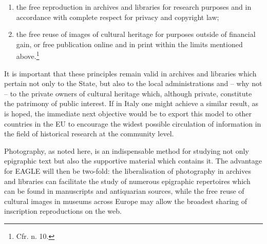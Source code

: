 \documentclass[amsthm,ebook]{saparticle}
\begin{document}
\begin{enumerate}
\item the free reproduction in archives and libraries for research purposes and in accordance with complete respect for
privacy and copyright law;

\item the free reuse of images of cultural heritage for purposes outside of financial gain, or free publication online
and in print within the limits mentioned above.\footnote{Cfr. n. 10.}

\end{enumerate}

It is important that these principles remain valid in archives and libraries which pertain not only to the State, but
also to the local administrations and – why not – to the private owners of cultural heritage which, although private,
constitute the patrimony of public interest. If in Italy one might achieve a similar result, as is hoped, the immediate
next objective would be to export this model to other countries in the EU to encourage the widest possible circulation
of information in the field of historical research at the community level.

Photography, as noted here, is an indispensable method for studying not only epigraphic text but also the supportive
material which contains it. The advantage for EAGLE will then be two-fold: the liberalisation of photography in
archives and libraries can facilitate the study of numerous epigraphic repertoires which can be found in manuscripts
and antiquarian sources, while the free reuse of cultural images in museums across Europe may allow the broadest
sharing of inscription reproductions on the web.

\nocite{brugnoli_riproduzione_2013}
\nocite{casini_gli_2015}
\nocite{ciociola_libere_2015}
\nocite{gallo_il_2014}
\nocite{giunta_viva_2015}
\nocite{lupoli_libere_2015}
\nocite{manacorda_fotografare_2014}
\nocite{manacorda_tutela._2014}
\nocite{modolo_ricerca_2015}
\nocite{pavolini_situazione_2015}
\nocite{pigliaru_selfie_2015}
\nocite{stella_gabella_2014}
\nocite{stella_costose_2015}
\nocite{stella_biblioteche_2015}
\nocite{tumicelli_questione_2014}
\nocite{volpe_limmagine_2014}
\nocite{_lettera_2015}
\nocite{_appello_2013}



\end{document}
